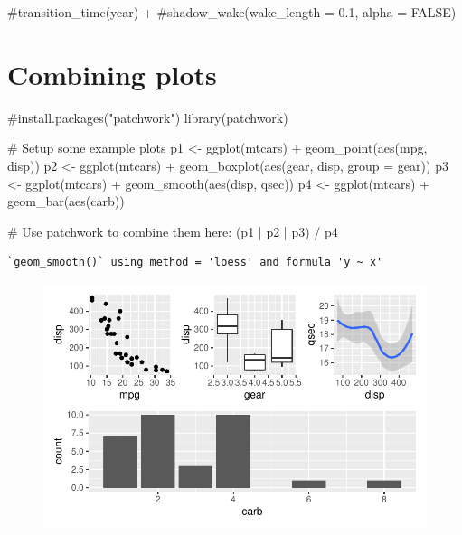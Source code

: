 \documentclass[
  letterpaper,
  DIV=11,
  numbers=noendperiod]{scrartcl}
\newenvironment{Shaded}{\begin{snugshade}}{\end{snugshade}}
\newcommand{\AttributeTok}[1]{\textcolor[rgb]{0.40,0.45,0.13}{#1}}
\newcommand{\CommentTok}[1]{\textcolor[rgb]{0.37,0.37,0.37}{#1}}
\newcommand{\FunctionTok}[1]{\textcolor[rgb]{0.28,0.35,0.67}{#1}}
\newcommand{\NormalTok}[1]{\textcolor[rgb]{0.00,0.23,0.31}{#1}}
\newcommand{\OtherTok}[1]{\textcolor[rgb]{0.00,0.23,0.31}{#1}}
\newcommand{\SpecialCharTok}[1]{\textcolor[rgb]{0.37,0.37,0.37}{#1}}
\begin{document}
\begin{Shaded}
\begin{Highlighting}[]
  \CommentTok{\#transition\_time(year) +}
  \CommentTok{\#shadow\_wake(wake\_length = 0.1, alpha = FALSE)}
\end{Highlighting}
\end{Shaded}

\hypertarget{combining-plots}{%
\section{Combining plots}\label{combining-plots}}

\begin{Shaded}
\begin{Highlighting}[]
\CommentTok{\#install.packages("patchwork")}
\FunctionTok{library}\NormalTok{(patchwork)}

\CommentTok{\# Setup some example plots }
\NormalTok{p1 }\OtherTok{\textless{}{-}} \FunctionTok{ggplot}\NormalTok{(mtcars) }\SpecialCharTok{+} \FunctionTok{geom\_point}\NormalTok{(}\FunctionTok{aes}\NormalTok{(mpg, disp))}
\NormalTok{p2 }\OtherTok{\textless{}{-}} \FunctionTok{ggplot}\NormalTok{(mtcars) }\SpecialCharTok{+} \FunctionTok{geom\_boxplot}\NormalTok{(}\FunctionTok{aes}\NormalTok{(gear, disp, }\AttributeTok{group =}\NormalTok{ gear))}
\NormalTok{p3 }\OtherTok{\textless{}{-}} \FunctionTok{ggplot}\NormalTok{(mtcars) }\SpecialCharTok{+} \FunctionTok{geom\_smooth}\NormalTok{(}\FunctionTok{aes}\NormalTok{(disp, qsec))}
\NormalTok{p4 }\OtherTok{\textless{}{-}} \FunctionTok{ggplot}\NormalTok{(mtcars) }\SpecialCharTok{+} \FunctionTok{geom\_bar}\NormalTok{(}\FunctionTok{aes}\NormalTok{(carb))}

\CommentTok{\# Use patchwork to combine them here:}
\NormalTok{(p1 }\SpecialCharTok{|}\NormalTok{ p2 }\SpecialCharTok{|}\NormalTok{ p3) }\SpecialCharTok{/}
\NormalTok{      p4}
\end{Highlighting}
\end{Shaded}

\begin{verbatim}
`geom_smooth()` using method = 'loess' and formula 'y ~ x'
\end{verbatim}

\begin{figure}[H]

{\centering \includegraphics{class05_files/figure-pdf/unnamed-chunk-7-1.pdf}

}

\end{figure}
\end{document}
